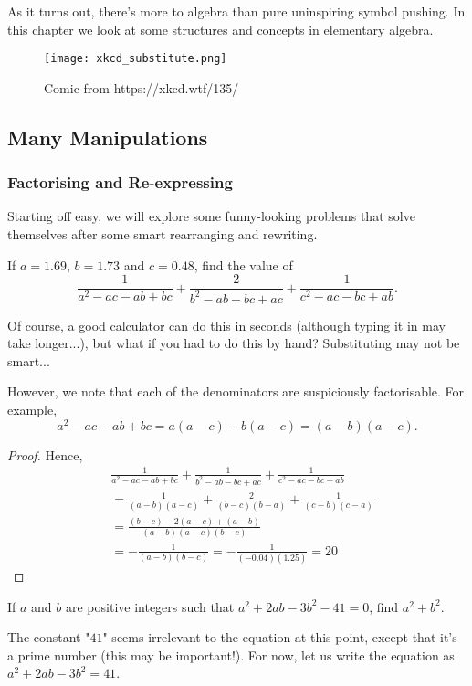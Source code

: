 \documentclass[../main.tex]{subfiles}
\begin{document}
As it turns out, there's more to algebra than pure uninspiring symbol pushing. In this chapter we look at some structures and concepts in elementary algebra.

\begin{figure}[H]
    \centering
    \texttt{[image: xkcd\_substitute.png]}
    \caption{Comic from https://xkcd.wtf/135/}
\end{figure}

\subsection{Many Manipulations}
\subsubsection{Factorising and Re-expressing}
Starting off easy, we will explore some funny-looking problems that solve themselves after some smart rearranging and rewriting.

\begin{example}[2013 SMO(J) P15]
    If $a=1.69$, $b=1.73$ and $c=0.48$, find the value of
    $$\frac{1}{a^2-ac-ab+bc}+\frac{2}{b^2-ab-bc+ac}+\frac{1}{c^2-ac-bc+ab}.$$
\end{example}
Of course, a good calculator can do this in seconds (although typing it in may take longer...), but what if you had to do this by hand? Substituting may not be smart...

However, we note that each of the denominators are suspiciously factorisable. For example,
$$a^2-ac-ab+bc=a(a-c)-b(a-c)=(a-b)(a-c).$$

\begin{proof}
    Hence,
\begin{align*}
    & \frac{1}{a^2-ac-ab+bc}+\frac{1}{b^2-ab-bc+ac}+\frac{1}{c^2-ac-bc+ab}\\
    &=\frac{1}{(a-b)(a-c)}+\frac{2}{(b-c)(b-a)}+\frac{1}{(c-b)(c-a)} \\
    &=\frac{(b-c)-2(a-c)+(a-b)}{(a-b)(a-c)(b-c)} \\
    &=-\frac{1}{(a-b)(b-c)} = -\frac{1}{(-0.04)(1.25)} = \boxed{20}
\end{align*}
\end{proof}


\begin{example}[2013 SMO(J) P32]
    If $a$ and $b$ are positive integers such that $a^2+2ab-3b^2-41=0$, find $a^2+b^2$.
\end{example}
The constant "$41$" seems irrelevant to the equation at this point, except that it's a prime number (this may be important!). For now, let us write the equation as $a^2+2ab-3b^2=41$.
\end{document}
